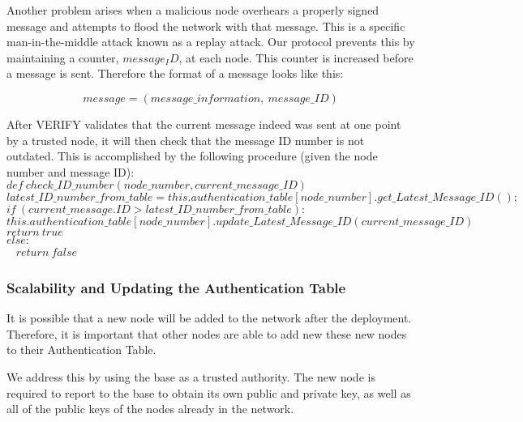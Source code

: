 \documentclass[letterpaper]{article}
\begin{document}
Another problem arises when a malicious node overhears a properly signed message and attempts to flood the network  with that message. This is a specific man-in-the-middle attack known as a replay attack. Our protocol prevents this by maintaining a counter, $message_ID$, at each node. This counter is increased before a message is sent. Therefore the format of a message looks like this:

$$message = (message\_information, \ message\_ID)$$

After \textsc{VERIFY} validates that the current message indeed was sent at one point by a trusted node, it will then check that the message ID number
is not outdated. This is accomplished by the following procedure (given the node number and message ID):
\\

$def \ check\_ID\_number(node\_number, current\_message\_ID)$ \\
\hspace*{10 mm} $latest\_ID\_number\_from\_table = this.authentication\_table[node\_number].get\_Latest\_Message\_ID();$
\hspace*{10 mm} $if \ (current\_message.ID > latest\_ID\_number\_from\_table):$\\
\hspace*{20 mm} $this.authentication\_table[node\_number].update\_Latest\_Message\_ID(current\_message\_ID)$\\
\hspace*{20 mm} $return \ true$ \\
\hspace*{10 mm} $else:$\\ \ 
\hspace*{20 mm} $return \ false$\\


\subsubsection{Scalability and Updating the Authentication Table}

It is possible that a new node will be added to the network after the deployment. 
Therefore, it is important that other nodes are able to add new these new nodes to their Authentication Table.

We address this by using the base as a trusted authority.
The new node is required to report to the base to obtain its own public and private key, as well as all of the public keys of the nodes already in the network.
\end{document}
